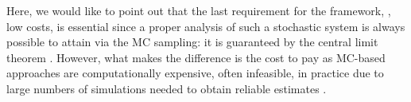 Here, we would like to point out that the last requirement for the framework, \ie, low costs, is essential since a proper analysis of such a stochastic system is always possible to attain via the MC sampling: it is guaranteed by the central limit theorem \cite{durrett2010}. However, what makes the difference is the cost to pay as MC-based approaches are computationally expensive, often infeasible, in practice due to large numbers of simulations needed to obtain reliable estimates \cite{xiu2010, maitre2010, diaz-emparanza2002}.
